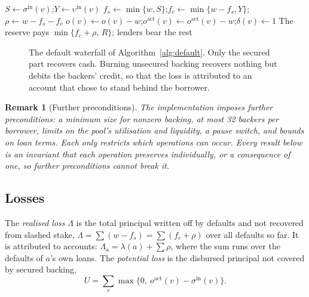\documentclass[acmsmall,nonacm,screen]{acmart}
\theoremstyle{acmdefinition}%
\newtheorem{remark}[theorem]{Remark}}
\newcommand{\sigin}{\sigma^{\mathrm{in}}}
\newcommand{\upsin}{\upsilon^{\mathrm{in}}}
\newcommand{\act}{\mathrm{act}}
\newcommand{\Op}[1]{\textsc{#1}}
\begin{document}
\begin{algorithm}[t]
  \caption{\Op{Default}: charging the unpaid principal $w$ of a loan of $v$}\label{alg:default}
  \DontPrintSemicolon
  $S\gets\sigin(v)$;\quad $Y\gets\upsin(v)$\;
  $f_s\gets\min\{w,S\}$;\quad $f_c\gets\min\{w-f_s,Y\}$;\quad $\rho\gets w-f_s-f_c$\;
  $o(v)\gets o(v)-w$;\quad $o^{\act}(v)\gets o^{\act}(v)-w$;\quad $\delta(v)\gets1$\;
  The reserve pays $\min\{f_c+\rho,\,R\}$; lenders bear the rest\;
\end{algorithm}

\begin{figure}[t]
  \centering
  
  \caption{The default waterfall of Algorithm~\ref{alg:default}. Only the secured part recovers
  cash. Burning unsecured backing recovers nothing but debits the backers' credit, so that the loss
  is attributed to an account that chose to stand behind the borrower.}
  \label{fig:waterfall}
\end{figure}

\begin{remark}[Further preconditions]\label{rem:preconditions}
The implementation imposes further preconditions: a minimum size for nonzero backing, at most 32
backers per borrower, limits on the pool's utilisation and liquidity, a pause switch, and bounds on
loan terms. Each only restricts which operations can occur. Every result below is an invariant
that each operation preserves individually, or a consequence of one, so further preconditions
cannot break it.
\end{remark}

\subsection{Losses}

\begin{definition}[Losses]\label{def:losses}
The \emph{realised loss} $\Lambda$ is the total principal written off by defaults and not recovered
from slashed stake, $\Lambda=\sum(w-f_s)=\sum(f_c+\rho)$ over all defaults so far. It is attributed
to accounts: $\Lambda_a=\lambda(a)+\sum\rho$, where the sum runs over the defaults of $a$'s own
loans. The \emph{potential loss} is the disbursed principal not covered by secured backing,
\[
  U=\sum_{v}\max\bigl\{0,\ o^{\act}(v)-\sigin(v)\bigr\}.
\]
\end{definition}
\end{document}
